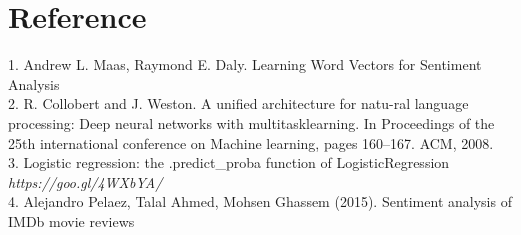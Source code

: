\documentclass[11pt]{article}
\begin{document}
\section*{Reference}
1. Andrew L. Maas, Raymond E. Daly. Learning Word Vectors for Sentiment Analysis\\
2. R. Collobert and J. Weston.  A unified architecture for natu-ral language processing: Deep neural networks with multitasklearning.  In Proceedings of the 25th international conference on Machine learning, pages 160–167. ACM, 2008. \\
3. Logistic regression: the .predict\_proba function of LogisticRegression \textit{https://goo.gl/4WXbYA/}\\
4. Alejandro Pelaez, Talal Ahmed, Mohsen Ghassem (2015). Sentiment analysis of IMDb movie reviews
\end{document}

